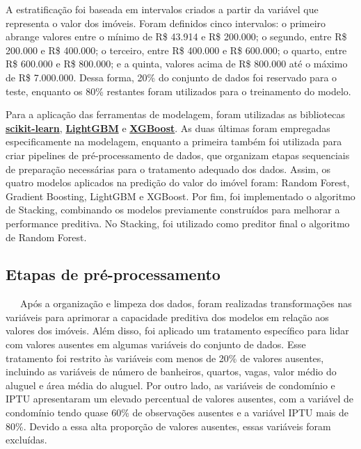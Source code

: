 \documentclass[
  12pt,
  a4paper,
]{scrreprt}
\begin{document}
A estratificação foi baseada em intervalos criados a partir da variável
que representa o valor dos imóveis. Foram definidos cinco intervalos: o
primeiro abrange valores entre o mínimo de R\$ 43.914 e R\$ 200.000; o
segundo, entre R\$ 200.000 e R\$ 400.000; o terceiro, entre R\$ 400.000
e R\$ 600.000; o quarto, entre R\$ 600.000 e R\$ 800.000; e a quinta,
valores acima de R\$ 800.000 até o máximo de R\$ 7.000.000. Dessa forma,
20\% do conjunto de dados foi reservado para o teste, enquanto os 80\%
restantes foram utilizados para o treinamento do modelo.

\vspace{12pt}

Para a aplicação das ferramentas de modelagem, foram utilizadas as
bibliotecas
\href{https://scikit-learn.org/stable/}{\textbf{scikit-learn}},
\href{https://lightgbm.readthedocs.io/en/stable/}{\textbf{LightGBM}} e
\href{https://xgboost.readthedocs.io/en/stable/}{\textbf{XGBoost}}. As
duas últimas foram empregadas especificamente na modelagem, enquanto a
primeira também foi utilizada para criar pipelines de pré-processamento
de dados, que organizam etapas sequenciais de preparação necessárias
para o tratamento adequado dos dados. Assim, os quatro modelos aplicados
na predição do valor do imóvel foram: Random Forest, Gradient Boosting,
LightGBM e XGBoost. Por fim, foi implementado o algoritmo de Stacking,
combinando os modelos previamente construídos para melhorar a
performance preditiva. No Stacking, foi utilizado como preditor final o
algoritmo de Random Forest.

\subsection{Etapas de
pré-processamento}\label{etapas-de-pruxe9-processamento}

~~~Após a organização e limpeza dos dados, foram realizadas
transformações nas variáveis para aprimorar a capacidade preditiva dos
modelos em relação aos valores dos imóveis. Além disso, foi aplicado um
tratamento específico para lidar com valores ausentes em algumas
variáveis do conjunto de dados. Esse tratamento foi restrito às
variáveis com menos de 20\% de valores ausentes, incluindo as variáveis
de número de banheiros, quartos, vagas, valor médio do aluguel e área
média do aluguel. Por outro lado, as variáveis de condomínio e IPTU
apresentaram um elevado percentual de valores ausentes, com a variável
de condomínio tendo quase 60\% de observações ausentes e a variável IPTU
mais de 80\%. Devido a essa alta proporção de valores ausentes, essas
variáveis foram excluídas.
\end{document}
